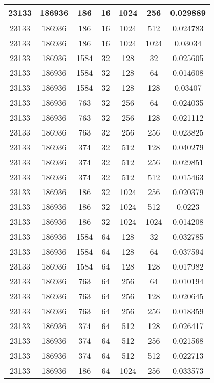 \documentclass[9pt]{article}
\begin{document}
\begin{tabular}{|c|c|c|c|c|c|c| }
\hline
23133  & 186936  & 186  & 16  & 1024  & 256  & 0.029889 \\
\hline
23133  & 186936  & 186  & 16  & 1024  & 512  & 0.024783 \\
\hline
23133  & 186936  & 186  & 16  & 1024  & 1024  & 0.03034 \\
\hline
23133  & 186936  & 1584  & 32  & 128  & 32  & 0.025605 \\
\hline
23133  & 186936  & 1584  & 32  & 128  & 64  & 0.014608 \\
\hline
23133  & 186936  & 1584  & 32  & 128  & 128  & 0.03407 \\
\hline
23133  & 186936  & 763  & 32  & 256  & 64  & 0.024035 \\
\hline
23133  & 186936  & 763  & 32  & 256  & 128  & 0.021112 \\
\hline
23133  & 186936  & 763  & 32  & 256  & 256  & 0.023825 \\
\hline
23133  & 186936  & 374  & 32  & 512  & 128  & 0.040279 \\
\hline
23133  & 186936  & 374  & 32  & 512  & 256  & 0.029851 \\
\hline
23133  & 186936  & 374  & 32  & 512  & 512  & 0.015463 \\
\hline
23133  & 186936  & 186  & 32  & 1024  & 256  & 0.020379 \\
\hline
23133  & 186936  & 186  & 32  & 1024  & 512  & 0.0223 \\
\hline
23133  & 186936  & 186  & 32  & 1024  & 1024  & 0.014208 \\
\hline
23133  & 186936  & 1584  & 64  & 128  & 32  & 0.032785 \\
\hline
23133  & 186936  & 1584  & 64  & 128  & 64  & 0.037594 \\
\hline
23133  & 186936  & 1584  & 64  & 128  & 128  & 0.017982 \\
\hline
23133  & 186936  & 763  & 64  & 256  & 64  & 0.010194 \\
\hline
23133  & 186936  & 763  & 64  & 256  & 128  & 0.020645 \\
\hline
23133  & 186936  & 763  & 64  & 256  & 256  & 0.018359 \\
\hline
23133  & 186936  & 374  & 64  & 512  & 128  & 0.026417 \\
\hline
23133  & 186936  & 374  & 64  & 512  & 256  & 0.021568 \\
\hline
23133  & 186936  & 374  & 64  & 512  & 512  & 0.022713 \\
\hline
23133  & 186936  & 186  & 64  & 1024  & 256  & 0.033573 \\

\end{tabular}
\end{document}
